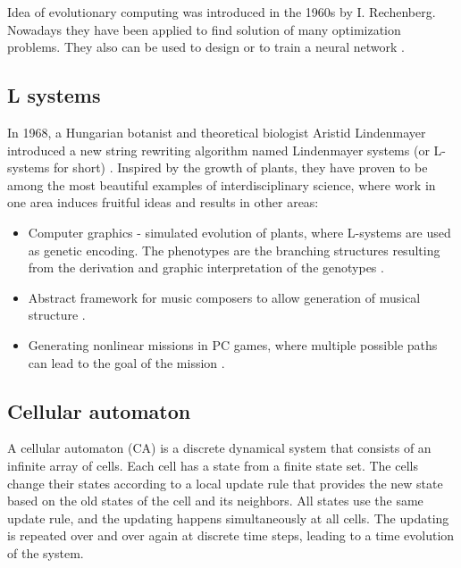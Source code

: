 Idea of evolutionary computing was introduced in the 1960s by I. Rechenberg. Nowadays they have been applied to find solution of many optimization problems. They also can be used to design or to train a neural network \cite{Montana:1989:TrainNeuronByGenetic}.


\subsection{L systems} %
\label{sub:l_systems}

In 1968, a Hungarian botanist and theoretical biologist Aristid Lindenmayer introduced a new string rewriting algorithm named Lindenmayer systems (or  L-systems for short) \cite{Lindenmayer68, Rozenberg12Lindenmayer}. Inspired by the growth of plants, they have proven to be among the most beautiful examples of interdisciplinary science, where work in one area induces fruitful ideas and results in other areas:
\begin{itemize}
  \item Computer graphics - simulated evolution of plants, where L-systems are used as genetic encoding. The phenotypes are the branching structures resulting from the derivation and graphic interpretation of the genotypes \cite{Ochoa98GeneticLSystems}.
  \item Abstract framework for music composers to allow generation of musical structure \cite{Manousakis06MusicalLSystems}.
  \item Generating nonlinear missions in PC games, where multiple possible paths can lead to the goal of the mission \cite{Togelius2016LSystemsLevels}.
\end{itemize}


\subsection{Cellular automaton} %
\label{sub:cellular_automaton}

A cellular automaton (CA) is a discrete dynamical system that consists of an infinite array of cells. Each cell has a state from a finite state set. The cells change their states according to a local update rule that provides the new state based on the old states of the cell and its neighbors. All states use the same update rule, and the updating happens simultaneously at all cells. The updating is repeated over and over again at discrete time steps, leading to a time evolution of the system.


